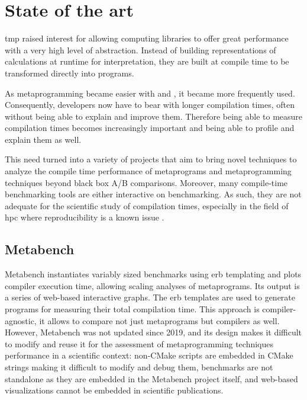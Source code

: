 \documentclass[../main]{subfiles}
\begin{document}
\section{
  State of the art
}

\cpp \gls{tmp} raised interest for allowing computing libraries
to offer great performance with a very high level of abstraction.
Instead of building representations of calculations at runtime for
interpretation, they are built at compile time to be transformed directly into
programs.

As metaprogramming became easier with  and ,
it became more frequently used.
Consequently, developers now have to bear with longer
compilation times, often without being able to explain and improve them.
Therefore being able to measure compilation times becomes increasingly important
and being able to profile and explain them as well.

This need turned into a variety of projects that aim to bring novel techniques
to analyze the compile time performance of \cpp metaprograms and metaprogramming
techniques beyond black box A/B comparisons. Moreover, many compile-time
benchmarking tools are either interactive on benchmarking. As such, they are not
adequate for the scientific study of compilation times, especially in the field
of \gls{hpc} where reproducibility is a known issue
\cite{antunes2024reproducibility}.

\subsection{
  Metabench
}

Metabench\cite{metabench} instantiates variably sized benchmarks using
\gls{erb} templating and plots compiler execution time, allowing
scaling analyses of metaprograms. Its output is a series of web-based
interactive graphs.
The \gls{erb} templates are used to generate \cpp programs for measuring their
total compilation time. This approach is compiler-agnostic, it allows to compare
not just metaprograms but compilers as well.
\\

However, Metabench was not updated since 2019, and its design makes it
difficult to modify and reuse it for the assessment of metaprogramming
techniques performance in a scientific context:
non-CMake scripts are embedded in CMake strings making it difficult to modify
and debug them, benchmarks are not standalone as they are embedded
in the Metabench project itself, and web-based visualizations cannot be embedded
in scientific publications.
\end{document}
